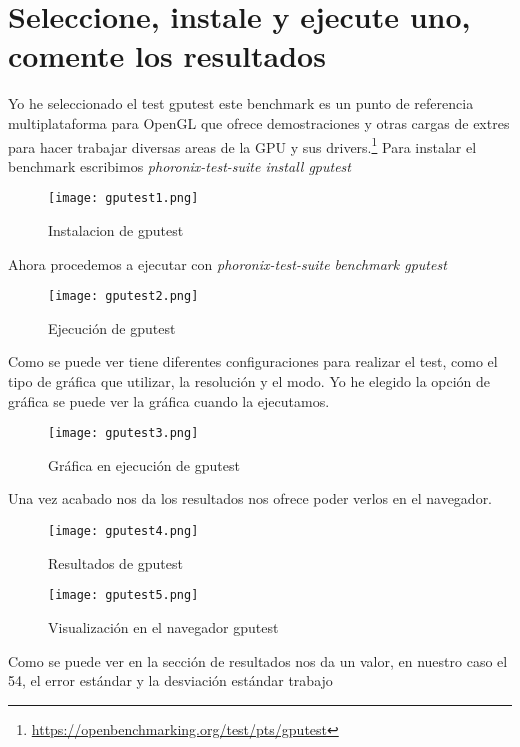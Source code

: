 \section{Seleccione, instale y ejecute uno, comente los resultados}
Yo he seleccionado el test gputest este benchmark es un punto de referencia multiplataforma para OpenGL que ofrece demostraciones y otras cargas de extres para hacer trabajar diversas areas de la GPU y sus drivers.\footnote{\url{https://openbenchmarking.org/test/pts/gputest}}
Para instalar el benchmark escribimos \textit{phoronix-test-suite install gputest} 
\begin{figure}[H] 
\centering
\texttt{[image: gputest1.png]}  
\label{figura4:}
\caption{Instalacion de gputest}
\end{figure}
Ahora procedemos a ejecutar con \textit{phoronix-test-suite benchmark gputest}
\begin{figure}[H] 
\centering
\texttt{[image: gputest2.png]}  
\label{figura5:}
\caption{Ejecución de gputest}
\end{figure}
Como se puede ver tiene diferentes configuraciones para realizar el test, como el tipo de gráfica que utilizar, la resolución y el modo.
Yo he elegido la opción de gráfica se puede ver la gráfica cuando la ejecutamos.
\begin{figure}[H] 
\centering
\texttt{[image: gputest3.png]}  
\label{figura6:}
\caption{Gráfica en ejecución de gputest}
\end{figure}
Una vez acabado nos da los resultados nos ofrece poder verlos en el navegador.
\begin{figure}[H] 
\centering
\texttt{[image: gputest4.png]}  
\label{figura7:}
\caption{Resultados de gputest}
\end{figure}
\begin{figure}[H] 
\centering
\texttt{[image: gputest5.png]}  
\label{figura8:}
\caption{Visualización en el navegador gputest}
\end{figure}
Como se puede ver en la sección de resultados nos da un valor, en nuestro caso el 54, el error estándar y la desviación estándar
trabajo 

